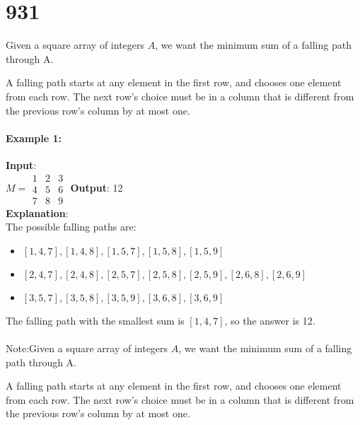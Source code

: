 \section{931}
Given a square array of integers $A$, we want the minimum sum of a falling path through A.
\par
A falling path starts at any element in the first row, and chooses one element from each row.  The next row's choice must be in a column that is different from the previous row's column by at most one.
\paragraph{Example 1:}
\begin{flushleft}
\textbf{Input}:
\\
$M = \begin{array}{ccc}
1 & 2 & 3 \\
4 & 5 & 6 \\
7 & 8 & 9 
\end{array}$
\textbf{Output}: 12
\\
\textbf{Explanation}:
\\
The possible falling paths are:
\begin{itemize}
\item $[1,4,7], [1,4,8], [1,5,7], [1,5,8], [1,5,9]$
\item $[2,4,7], [2,4,8], [2,5,7], [2,5,8], [2,5,9], [2,6,8], [2,6,9]$
\item $[3,5,7], [3,5,8], [3,5,9], [3,6,8], [3,6,9]$
\end{itemize}
The falling path with the smallest sum is $[1,4,7]$, so the answer is 12.
\end{flushleft}
\paragraph{}
Note:Given a square array of integers $A$, we want the minimum sum of a falling path through A.
\par
A falling path starts at any element in the first row, and chooses one element from each row.  The next row's choice must be in a column that is different from the previous row's column by at most one.
